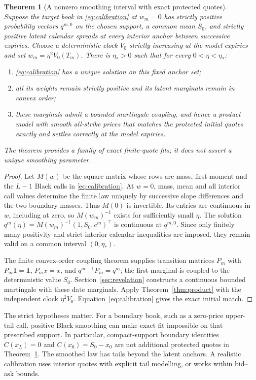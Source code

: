 \documentclass[11pt,a4paper]{article}
\numberwithin{equation}{section}
\newtheorem{theorem}{Theorem}[section]
\theoremstyle{definition}\newtheorem{definition}[theorem]{Definition}
\theoremstyle{remark}\newtheorem{remark}[theorem]{Remark}
\begin{document}
\begin{theorem}[A nonzero smoothing interval with exact protected quotes]
\label{thm:local-fit}
Suppose the target book in \eqref{eq:calibration} at $w_m=0$ has strictly positive probability vectors $q^{m,0}$ on the chosen support, a common mean $S_0$, and strictly positive latent calendar spreads at every interior anchor between successive expiries. Choose a deterministic clock $V_0$ strictly increasing at the model expiries and set $w_m=\eta^2V_0(T_m)$. There is $\eta_*>0$ such that for every $0<\eta<\eta_*$:
\begin{enumerate}[label=(\roman*)]
\item \eqref{eq:calibration} has a unique solution on this fixed anchor set;
\item all its weights remain strictly positive and its latent marginals remain in convex order;
\item these marginals admit a bounded martingale coupling, and hence a product model with smooth all-strike prices that matches the protected initial quotes exactly and settles correctly at the model expiries.
\end{enumerate}
The theorem provides a family of exact finite-quote fits; it does not assert a unique smoothing parameter.
\end{theorem}
\begin{proof}
Let $M(w)$ be the square matrix whose rows are mass, first moment and the $L-1$ Black calls in \eqref{eq:calibration}. At $w=0$, mass, mean and all interior call values determine the finite law uniquely by successive slope differences and the two boundary masses. Thus $M(0)$ is invertible. Its entries are continuous in $w$, including at zero, so $M(w_m)^{-1}$ exists for sufficiently small $\eta$. The solution $q^m(\eta)=M(w_m)^{-1}(1,S_0,c^m)^\top$ is continuous at $q^{m,0}$. Since only finitely many positivity and strict interior calendar inequalities are imposed, they remain valid on a common interval $(0,\eta_*)$.

The finite convex-order coupling theorem \cite{Strassen} supplies transition matrices $P_m$ with $P_m\boldsymbol1=\boldsymbol1$, $P_mx=x$, and $q^{m-1}P_m=q^m$; the first marginal is coupled to the deterministic value $S_0$. Section~\ref{sec:revelation} constructs a continuous bounded martingale with these date marginals. Apply Theorem~\ref{thm:product} with the independent clock $\eta^2V_0$. Equation~\eqref{eq:calibration} gives the exact initial match.
\end{proof}
The strict hypotheses matter. For a boundary book, such as a zero-price upper-tail call, positive Black smoothing can make exact fit impossible on that prescribed support. In particular, compact-support boundary identities $C(x_L)=0$ and $C(x_0)=S_0-x_0$ are not additional protected quotes in Theorem~\ref{thm:local-fit}. The smoothed law has tails beyond the latent anchors. A realistic calibration uses interior quotes with explicit tail modelling, or works within bid--ask bounds.
\end{document}
